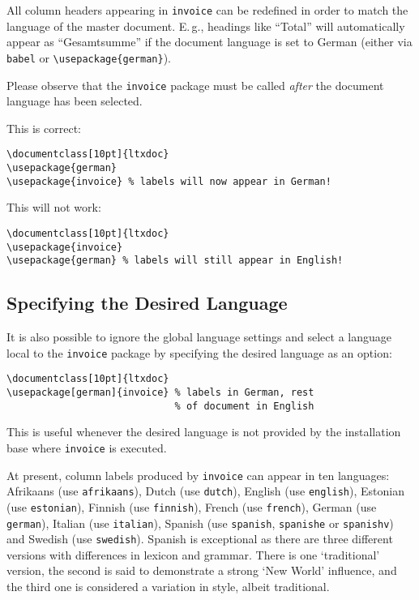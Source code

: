\documentclass[11pt]{ltxdoc}
\begin{document}
All column headers appearing in \texttt{invoice} can be redefined in
order to match the language of the master document. E.\,g., headings
like ``Total'' will automatically appear as ``Gesamtsumme'' if the
document language is set to German (either via \texttt{babel} or
\verb-\usepackage{german}-).

Please observe that the \texttt{invoice} package must be called {\em
after} the document language has been selected.

This is correct:

\begin{verbatim}
\documentclass[10pt]{ltxdoc}
\usepackage{german}
\usepackage{invoice} % labels will now appear in German!
\end{verbatim}

This will not work:

\begin{verbatim}
\documentclass[10pt]{ltxdoc}
\usepackage{invoice}
\usepackage{german} % labels will still appear in English!
\end{verbatim}


\subsection{Specifying the Desired Language}

It is also possible to ignore the global language settings and select
a language local to the \texttt{invoice} package by specifying the
desired language as an option:

\begin{verbatim}
\documentclass[10pt]{ltxdoc}
\usepackage[german]{invoice} % labels in German, rest 
                             % of document in English
\end{verbatim}

This is useful whenever the desired language is not provided by the
installation base where \texttt{invoice} is executed.

At present, column labels produced by \texttt{invoice} can appear
in ten languages:
Afrikaans (use \verb|afrikaans|),
Dutch (use \verb|dutch|),
English (use \verb|english|),
Estonian (use \verb|estonian|),
Finnish (use \verb|finnish|),
French (use \verb|french|),
German (use \verb|german|),
Italian (use \verb|italian|),
Spanish (use \verb|spanish|, \verb|spanishe| or \verb|spanishv|) and
Swedish (use \verb|swedish|).
Spanish is exceptional as there are three different versions
with differences in lexicon and grammar. There is one `traditional'
version, the second is said to demonstrate a strong `New World' influence,
and the third one is considered a variation in style, albeit 
traditional.
\end{document}
